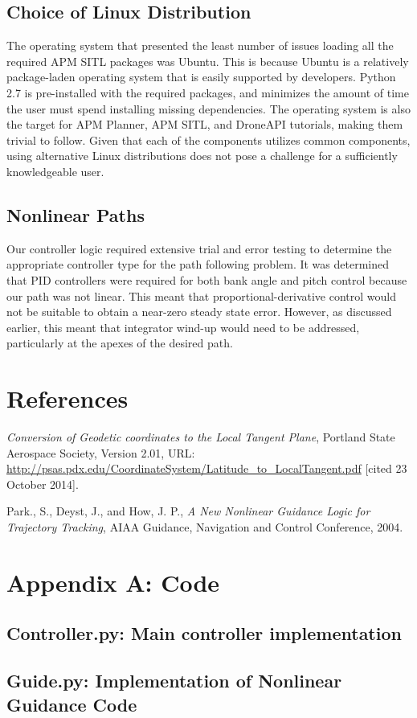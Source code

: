 \documentclass{aiaa}
\newcommand{\python}[2]{
  \hrulefill
  \subsection*{#1}
  
  \vspace{2em}
}
\begin{document}
\subsection{Choice of Linux Distribution}
The operating system that presented the least number of issues loading all the required APM SITL packages was Ubuntu. This is because Ubuntu is a relatively package-laden operating system that is easily supported by developers. Python 2.7 is pre-installed with the required packages, and minimizes the amount of time the user must spend installing missing dependencies. The operating system is also the target for APM Planner, APM SITL, and DroneAPI tutorials, making them trivial to follow. Given that each of the components utilizes common components, using alternative Linux distributions does not pose a challenge for a sufficiently knowledgeable user.

\subsection{Nonlinear Paths}
Our controller logic required extensive trial and error testing to determine the appropriate controller type for the path following problem. It was determined that PID controllers were required for both bank angle and pitch control because our path was not linear. This meant that proportional-derivative control would not be suitable to obtain a near-zero steady state error. However, as discussed earlier, this meant that integrator wind-up would need to be addressed, particularly at the apexes of the desired path.

\section{References}
\textit{Conversion of Geodetic coordinates to the Local Tangent Plane}, Portland State Aerospace Society, Version 2.01, URL: \url{http://psas.pdx.edu/CoordinateSystem/Latitude\_to\_LocalTangent.pdf} [cited 23 October 2014].

Park., S., Deyst, J., and How, J. P., \textit{A New Nonlinear Guidance Logic for Trajectory Tracking}, AIAA Guidance, Navigation and Control Conference, 2004.
\newpage
\section{Appendix A: Code}
\python{Controller.py: Main controller implementation}{../controller/controller.py}
\newpage
\python{Guide.py: Implementation of Nonlinear Guidance Code}{../controller/L1Guide.py}
\end{document}
